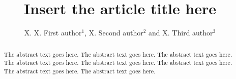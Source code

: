 \documentclass[openacc]{rstransa}%
\begin{document}
\title{Insert the article title here}

\author{%
X. X. First author$^{1}$, X. Second author$^{2}$ and X. Third author$^{3}$}

\address{$^{1}$First author address\\
$^{2}$Second author address\\
$^{3}$Third author address}

\subject{xxxxx, xxxxx, xxxx}



\begin{abstract}
The abstract text goes here. The abstract text goes here. The abstract text goes here. The abstract text goes here.
The abstract text goes here. The abstract text goes here. The abstract text goes here. The abstract text goes here.
\end{abstract}

\end{document}
